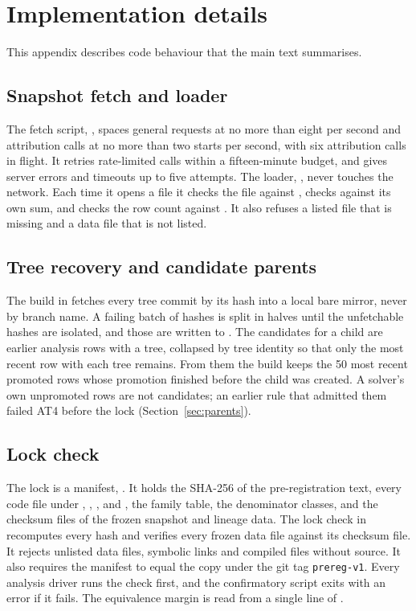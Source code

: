 \appendix
\section{Implementation details}
\label{app:impl}

This appendix describes code behaviour that the main text summarises.

\subsection{Snapshot fetch and loader}
\label{app:snapshot}

The fetch script, , spaces general requests at no more than eight per second and attribution calls at no more than two starts per second, with six attribution calls in flight.
It retries rate-limited calls within a fifteen-minute budget, and gives server errors and timeouts up to five attempts.
The loader, , never touches the network.
Each time it opens a file it checks the file against , checks  against its own sum, and checks the row count against .
It also refuses a listed file that is missing and a data file that is not listed.

\subsection{Tree recovery and candidate parents}
\label{app:trees}

The build in  fetches every tree commit by its hash into a local bare mirror, never by branch name.
A failing batch of hashes is split in halves until the unfetchable hashes are isolated, and those are written to .
The candidates for a child are earlier analysis rows with a tree, collapsed by tree identity so that only the most recent row with each tree remains.
From them the build keeps the 50 most recent promoted rows whose promotion finished before the child was created. A solver's own unpromoted rows are not candidates; an earlier rule that admitted them failed AT4 before the lock (Section~\ref{sec:parents}).

\subsection{Lock check}
\label{app:lock}

The lock is a manifest, .
It holds the SHA-256 of the pre-registration text, every code file under , , ,  and , the family table, the denominator classes, and the checksum files of the frozen snapshot and lineage data.
The lock check in  recomputes every hash and verifies every frozen data file against its checksum file.
It rejects unlisted data files, symbolic links and compiled files without source.
It also requires the manifest to equal the copy under the git tag \texttt{prereg-v1}.
Every analysis driver runs the check first, and the confirmatory script exits with an error if it fails.
The equivalence margin is read from a single line of .

